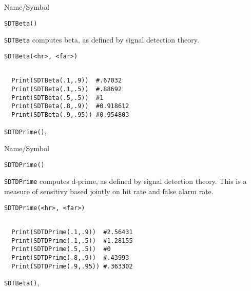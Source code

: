\begin{desc}{Name/Symbol}
\item[Name/Symbol] 	\verb+SDTBeta()+

\item[Description] \verb+SDTBeta+ computes beta, as defined by signal detection theory.  

\item[Usage]        	
\begin{verbatim}
SDTBeta(<hr>, <far>)
\end{verbatim}

\item[Example] 	
\begin{verbatim}

  Print(SDTBeta(.1,.9))  #.67032
  Print(SDTBeta(.1,.5))  #.88692
  Print(SDTBeta(.5,.5))  #1
  Print(SDTBeta(.8,.9))  #0.918612
  Print(SDTBeta(.9,.95)) #0.954803
\end{verbatim}

\item[See Also]\verb+SDTDPrime()+,
\end{desc}
\begin{desc}{Name/Symbol}
\item[Name/Symbol] 	\verb+SDTDPrime()+

\item[Description] \verb+SDTDPrime+ computes d-prime, as defined by
signal detection theory.  This is a measure of sensitivy based jointly
on hit rate and false alarm rate.

\item[Usage]        	
\begin{verbatim}
SDTDPrime(<hr>, <far>)
\end{verbatim}

\item[Example] 	
\begin{verbatim}

  Print(SDTDPrime(.1,.9))  #2.56431
  Print(SDTDPrime(.1,.5))  #1.28155
  Print(SDTDPrime(.5,.5))  #0
  Print(SDTDPrime(.8,.9))  #.43993
  Print(SDTDPrime(.9,.95)) #.363302

\end{verbatim}

\item[See Also]\verb+SDTBeta()+,
\end{desc}



